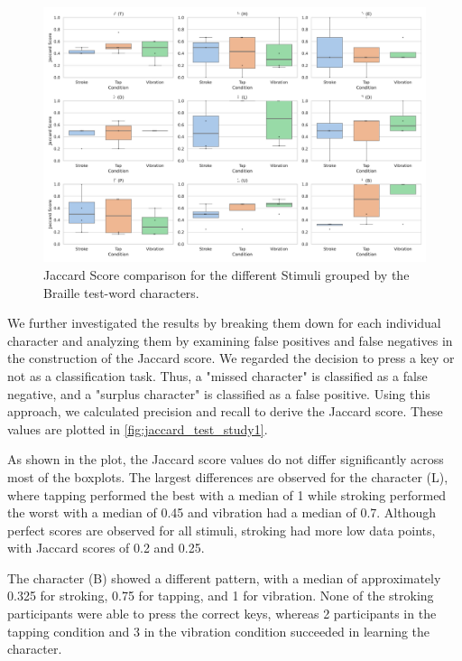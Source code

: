 \begin{figure}
    \centering
    \includegraphics[width=\linewidth]{src/pictures/Study1Data_Experiment/character_jaccard_test_study1.pdf}
    \caption{Jaccard Score comparison for the different Stimuli grouped by the Braille test-word characters.}
    \label{fig:jaccard_test_study1}
\end{figure}


We further investigated the results by breaking them down for each individual character and analyzing them by examining false positives and false negatives in the construction of the Jaccard score. 
We regarded the decision to press a key or not as a classification task. 
Thus, a "missed character" is classified as a false negative, and a "surplus character" is classified as a false positive. 
Using this approach, we calculated precision and recall to derive the Jaccard score. 
These values are plotted in \autoref{fig:jaccard_test_study1}. 

As shown in the plot, the Jaccard score values do not differ significantly across most of the boxplots. 
The largest differences are observed for the character (L), where tapping performed the best with a median of 1 while stroking performed the worst with a median of 0.45 and vibration had a median of 0.7. 
Although perfect scores are observed for all stimuli, stroking had more low data points, with Jaccard scores of 0.2 and 0.25.

The character (B) showed a different pattern, with a median of approximately 0.325 for stroking, 0.75 for tapping, and 1 for vibration. 
None of the stroking participants were able to press the correct keys, whereas 2 participants in the tapping condition and 3 in the vibration condition succeeded in learning the character.

